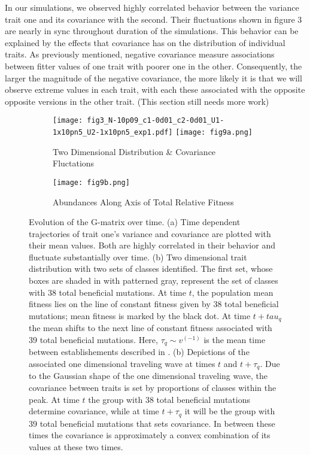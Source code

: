 \documentclass[11pt,twocolumn]{article}
\begin{document}
In our simulations, we observed highly correlated behavior between the variance trait one and its covariance with the second.  Their fluctuations shown in figure 3 are nearly in sync throughout duration of the simulations. This behavior can be explained by the effects that covariance has on the distribution of individual traits.  As previously mentioned, negative covariance measure associations between fitter values of one trait with poorer one in the other.  Consequently, the larger the magnitude of the negative covariance, the more likely it is that we will observe extreme values in each trait, with each these associated with the opposite opposite versions in the other trait.   (This section still needs more work)\par

\begin{figure}[h!]
\begin{subfigure}[b]{1\linewidth}
\label{a}
\caption{Two Dimensional Distribution \& Covariance Fluctations}
\texttt{[image: fig3\_N-10p09\_c1-0d01\_c2-0d01\_U1-1x10pn5\_U2-1x10pn5\_exp1.pdf]}
\texttt{[image: fig9a.png]}
\end{subfigure}
\begin{subfigure}[b]{1\linewidth}
\label{b}
\caption{Abundances Along Axis of Total Relative Fitness}
\texttt{[image: fig9b.png]}
\end{subfigure}
\label{Fig 5}
\caption{\footnotesize Evolution of the G-matrix over time. (a) Time dependent trajectories of trait one's variance and covariance are plotted with their mean values. Both are highly correlated in their behavior and fluctuate substantially over time. (b) Two dimensional trait distribution with two sets of classes identified. The first set, whose boxes are shaded in with patterned gray, represent the set of classes with 38 total beneficial mutations.  At time $t$, the population mean fitness lies on the line of constant fitness given by 38 total beneficial mutations; mean fitness is marked by the black dot. At time $t+tau_q$ the mean shifts to the next line of constant fitness associated with 39 total beneficial mutations. Here, $\tau_q \sim v^(-1)$ is the mean time between establishements described in \cite{desai2007beneficial}. (b) Depictions of the associated one dimensional traveling wave at times $t$ and $t+\tau_q$. Due to the Gaussian shape of the one dimensional traveling wave, the covariance between traits is set by proportions of classes within the peak. At time $t$ the group with 38 total beneficial mutations determine covariance, while at time $t+\tau_q$ it will be the group with 39 total beneficial mutations that sets covariance. In between these times the covariance is approximately a convex combination of its values at these two times.}
\end{figure}
\end{document}
